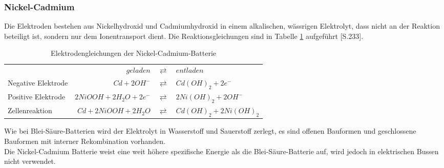 \subsubsection{Nickel-Cadmium}
Die Elektroden bestehen aus Nickelhydroxid und Cadmiumhydroxid in einem alkalischen, wässrigen Elektrolyt, dass nicht an der Reaktion beteiligt ist, sondern nur dem Ionentransport dient. Die Reaktionsgleichungen sind in Tabelle \ref{NiCd} aufgeführt \cite{Sterner:2014}[S.233].\\
\begin{table}\centering
  \begin{tabularx}{\linewidth}{XrcX}
  	                   &               $geladen$ & $\rightleftarrows$ & $entladen$             \\
  	Negative Elektrode &            $Cd + 2OH^-$ & $\rightleftarrows$ & $Cd(OH)_2 + 2e^-$      \\
  	Positive Elektrode & $2NiOOH + 2H_2O + 2e^-$ & $\rightleftarrows$ & $2Ni(OH)_2 + 2OH^-$    \\ \midrule
  	Zellenreaktion     &   $Cd + 2NiOOH + 2H_2O$ & $\rightleftarrows$ & $Cd(OH)_2 + 2Ni(OH)_2$ \\
  \end{tabularx}
  \caption{Elektrodengleichungen der Nickel-Cadmium-Batterie}
  \label{NiCd}
\end{table}
Wie bei Blei-Säure-Batterien wird der Elektrolyt in Wasserstoff und Sauerstoff zerlegt, es sind offenen Bauformen und geschlossene Bauformen mit interner Rekombination vorhanden.\\
Die Nickel-Cadmium Batterie weist eine weit höhere spezifische Energie als die Blei-Säure-Batterie auf, wird jedoch in elektrischen Bussen nicht verwendet.

